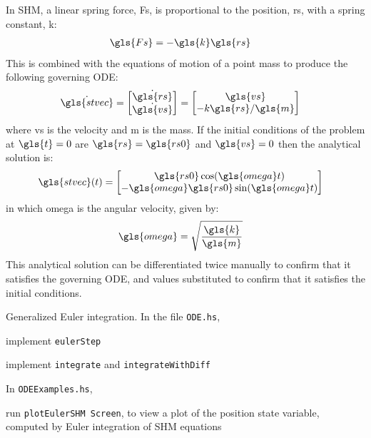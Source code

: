 \documentclass[12pt,openany]{book}
\newcommand{\filename}[1]{\texttt{#1}}  %
\newcommand{\code}[1]{\texttt{#1}}      %
\begin{document}
In SHM, a linear spring force, \gls{Fs}, is proportional to the position, \gls{rs}, with a spring constant, \gls{k}:
\begin{align}
  \gls{Fs} &= -\gls{k}\gls{rs}
\end{align}
This is combined with the equations of motion of a point mass to produce the following governing ODE:
\begin{align}
  \dot{\gls{stvec}} =
  \begin{bmatrix}\dot{\gls{rs}}\\\dot{\gls{vs}}\end{bmatrix} &=
  \begin{bmatrix}\gls{vs}\\-k\gls{rs}/\gls{m}\end{bmatrix}
\end{align}
where \gls{vs} is the velocity and \gls{m} is the mass. If the initial conditions of the problem at \(\gls{t} = 0\) are \(\gls{rs} = \gls{rs0}\) and \(\gls{vs} = 0\) then the analytical solution is:
\begin{align}
  \gls{stvec}(t) &=
  \begin{bmatrix}
    \gls{rs0}\cos(\gls{omega}t) \\
    -\gls{omega}\gls{rs0}\sin(\gls{omega}t)
  \end{bmatrix}
\end{align}
in which \gls{omega} is the angular velocity, given by:
\begin{align}
  \gls{omega} &= \sqrt{\frac{\gls{k}}{\gls{m}}}
\end{align}
This analytical solution can be differentiated twice manually to confirm that it satisfies the governing ODE, and values substituted to confirm that it satisfies the initial conditions.

\begin{problem}[label=eulerStepVectorSpace]{Generalized Euler integration.}
  In the file \filename{ODE.hs},
  \begin{probitemize}
  \item implement \code{eulerStep}
  \item implement \code{integrate} and \code{integrateWithDiff}
  \end{probitemize}
  In \filename{ODEExamples.hs},
  \begin{probitemize}
  \item run \code{plotEulerSHM Screen}, to view a plot of the position state variable, computed by Euler integration of SHM equations
  \end{probitemize}
\end{problem}
\end{document}
